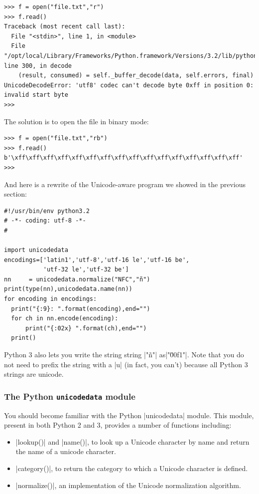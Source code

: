 \begin{Verbatim}
>>> f = open("file.txt","r")
>>> f.read()
Traceback (most recent call last):
  File "<stdin>", line 1, in <module>
  File "/opt/local/Library/Frameworks/Python.framework/Versions/3.2/lib/python3.2/codecs.py", line 300, in decode
    (result, consumed) = self._buffer_decode(data, self.errors, final)
UnicodeDecodeError: 'utf8' codec can't decode byte 0xff in position 0: invalid start byte
>>> 
\end{Verbatim}

The solution is to open the file in binary mode:

\begin{Verbatim}
>>> f = open("file.txt","rb")
>>> f.read()
b'\xff\xff\xff\xff\xff\xff\xff\xff\xff\xff\xff\xff\xff\xff\xff\xff'
>>> 
\end{Verbatim}

And here is a rewrite of the Unicode-aware program we showed in the previous section:
\begin{Verbatim}
#!/usr/bin/env python3.2 
# -*- coding: utf-8 -*- 
# 

import unicodedata
encodings=['latin1','utf-8','utf-16 le','utf-16 be',
           'utf-32 le','utf-32 be']
nn     = unicodedata.normalize("NFC","ñ")
print(type(nn),unicodedata.name(nn))
for encoding in encodings:
  print("{:9}: ".format(encoding),end="")
  for ch in nn.encode(encoding):
      print("{:02x} ".format(ch),end="")
  print()
\end{Verbatim}

Python 3 also lets you write the string string |"ñ"| as|"\u00f1"|. Note that you do not need to prefix the string with a |u| (in fact, you can't) because all Python 3 strings are unicode.


\subsubsection{The Python \texttt{unicodedata} module}
You should become familiar with the Python |unicodedata| module. This module, present in both Python 2 and 3, provides a number of functions including:

\begin{itemize}
\item |lookup()| and |name()|, to look up a Unicode character by name and return the name of a unicode character.
\item |category()|, to return the category to which a Unicode character is defined.
\item |normalize()|, an implementation of the Unicode normalization algorithm.
\end{itemize}

